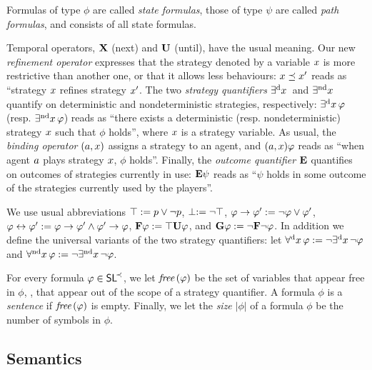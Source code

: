 Formulas of type $\phi$ are called \emph{state formulas}, those of type $\psi$
are called \emph{path formulas}, and \SLref consists of all state formulas.


Temporal operators, ${\bf X}$ (next) and
 ${\bf U}$ (until), have the usual meaning. Our new \emph{refinement
   operator} expresses that the strategy denoted by a variable $x$ is more
 restrictive than another one, or that it allows less behaviours: $x\preceq x'$ reads as ``strategy
 $x$ refines strategy $x'$. The two \emph{strategy
   quantifiers}  $\exists^{\text{d}} x\,$ and $\exists^{\text{nd}} x\,$ quantify on deterministic
 and nondeterministic strategies, respectively: $\exists^{\text{d}} x\,\varphi$
 (resp. $\exists^{\text{nd}} x\,\varphi$) reads as ``there exists a deterministic
 (resp. nondeterministic) strategy $x$
  such that $\phi$
 holds'', where $x$ is a strategy variable. 
As usual, the \emph{binding operator} $(a,x)$ assigns a strategy to an
 agent, and $(a,x)\varphi$ reads as ``when agent $a$ plays strategy $x$,
 $\phi$ holds''.
Finally, the \emph{outcome quantifier} ${\bf E}$ quantifies on
   outcomes of strategies currently in use: ${\bf E}\psi$ reads as ``$\psi$
 holds in some
 outcome of the strategies currently used by the players''.

We use usual abbreviations $\top:= p\vee\neg p$, $\perp:=\neg\top$, $\varphi\to\varphi':= \neg \varphi \vee \varphi'$,
$\varphi\leftrightarrow\varphi':= \varphi\to\varphi'\wedge \varphi'\to\varphi$,
 ${\bf F}\varphi := \top {\bf U} \varphi$,  and ${\bf G}\varphi := \neg {\bf F}
\neg \varphi$. In addition we
define the universal variants of the two strategy quantifiers:  let
$\forall^{\text{d}} x\,\varphi:=\neg\exists^{\text{d}} x\,\neg\varphi$ and $\forall^{\text{nd}} x\,\varphi:=\neg\exists^{\text{nd}} x\,\neg\varphi$.

For every formula $\varphi\in\textnormal{{\sffamily SL}}^{\!\prec}$, we let  $\textit{free}\,(\varphi)$ be the set of variables that appear
free in $\phi$, \ie, that
appear out of the scope of a strategy quantifier. A formula $\phi$ is a \emph{sentence} if $\textit{free}\,(\varphi)$ is empty.
Finally, we let the \emph{size} $|\phi|$ of a formula $\phi$ be the
number of symbols in $\phi$.


\subsection{Semantics}
\label{sec-SLmodels}

